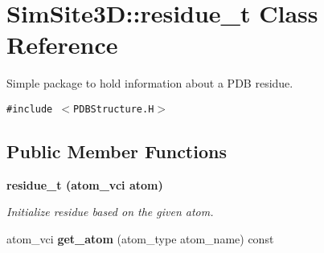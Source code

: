 \section{SimSite3D::residue\_\-t Class Reference}
\label{classSimSite3D_1_1residue__t}
Simple package to hold information about a PDB residue.  


{\tt \#include $<$PDBStructure.H$>$}

\subsection*{Public Member Functions}
\begin{CompactItemize}
\item 
\bf{residue\_\-t} (atom\_\-vci atom)\label{classSimSite3D_1_1residue__t_673a2f705f7d90b695899287ca440a17}

\begin{CompactList}\small\item\em Initialize residue based on the given atom. \item\end{CompactList}\item 
atom\_\-vci \textbf{get\_\-atom} (atom\_\-type atom\_\-name) const \label{classSimSite3D_1_1residue__t_2e728f3de20c3259a7b63843a8de7932}

\end{CompactItemize}
